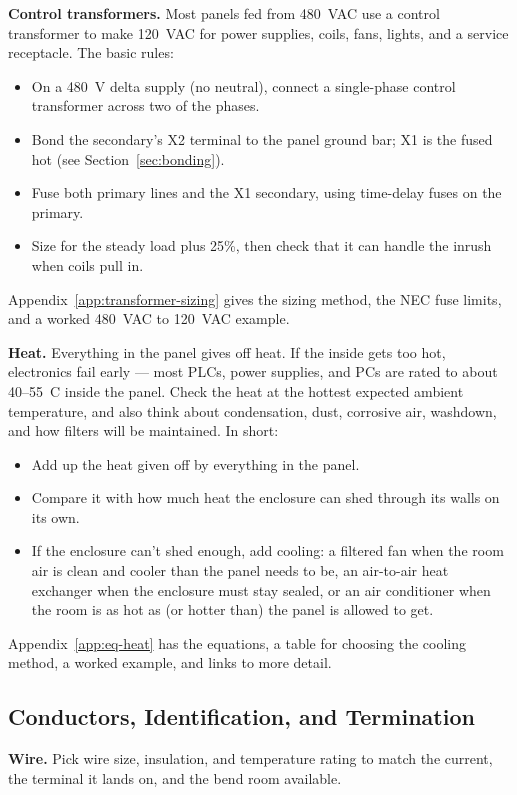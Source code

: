 \textbf{Control transformers.} Most panels fed from 480~VAC use a control transformer to make 120~VAC for power supplies, coils, fans, lights, and a service receptacle. The basic rules:
\begin{itemize}[itemsep=1pt]
  \item On a 480~V delta supply (no neutral), connect a single-phase control transformer across two of the phases.
  \item Bond the secondary's X2 terminal to the panel ground bar; X1 is the fused hot (see Section~\ref{sec:bonding}).
  \item Fuse both primary lines and the X1 secondary, using time-delay fuses on the primary.
  \item Size for the steady load plus 25\%, then check that it can handle the inrush when coils pull in.
\end{itemize}
Appendix~\ref{app:transformer-sizing} gives the sizing method, the NEC fuse limits, and a worked 480~VAC to 120~VAC example.

\textbf{Heat.} Everything in the panel gives off heat. If the inside gets too hot, electronics fail early --- most PLCs, power supplies, and PCs are rated to about 40--55~\textdegree C inside the panel. Check the heat at the hottest expected ambient temperature, and also think about condensation, dust, corrosive air, washdown, and how filters will be maintained. In short:
\begin{itemize}[itemsep=1pt]
  \item Add up the heat given off by everything in the panel.
  \item Compare it with how much heat the enclosure can shed through its walls on its own.
  \item If the enclosure can't shed enough, add cooling: a filtered fan when the room air is clean and cooler than the panel needs to be, an air-to-air heat exchanger when the enclosure must stay sealed, or an air conditioner when the room is as hot as (or hotter than) the panel is allowed to get.
\end{itemize}
Appendix~\ref{app:eq-heat} has the equations, a table for choosing the cooling method, a worked example, and links to more detail.

\subsection{Conductors, Identification, and Termination}\label{sec:conductors}
\textbf{Wire.} Pick wire size, insulation, and temperature rating to match the current, the terminal it lands on, and the bend room available.

